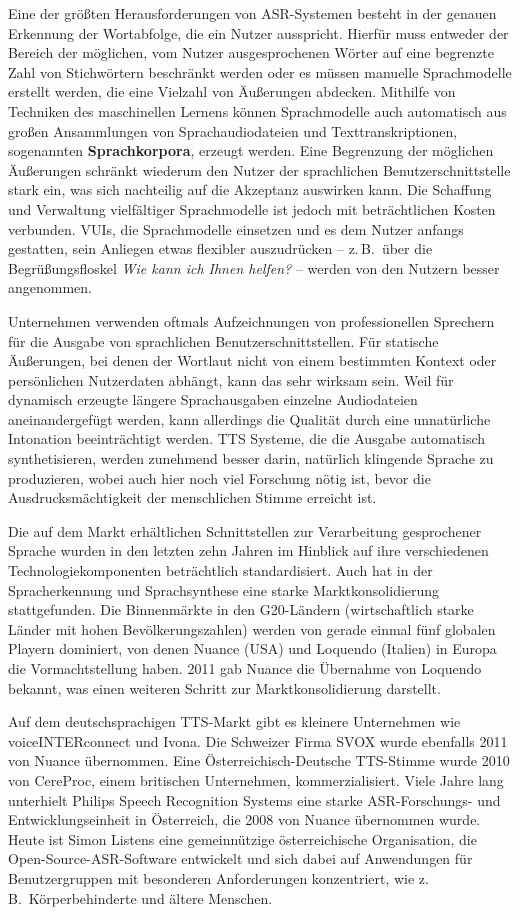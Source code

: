 \begin{multicols}{2}
Eine der größten Herausforderungen von ASR-Syste\-men besteht in der genauen Erkennung der Wortabfolge, die ein Nutzer ausspricht. Hierfür muss entweder der Bereich der möglichen, vom Nutzer ausgesprochenen Wörter auf eine begrenzte Zahl von Stichwörtern beschränkt werden oder es müssen manuelle Sprachmodelle erstellt werden, die eine Vielzahl von Äußerungen abdecken. Mithilfe von Techniken des maschinellen Lernens können Sprachmodelle auch automatisch aus großen Ansammlungen von Sprachaudiodateien und Texttranskriptionen, sogenannten \textbf{Sprachkorpora}, erzeugt werden. Eine Begrenzung der möglichen Äußerungen schränkt wiederum den Nutzer der sprachlichen Benutzerschnittstelle stark ein, was sich nachteilig auf die Akzeptanz auswirken kann. Die Schaffung und Verwaltung vielfältiger Sprachmodelle ist jedoch mit beträchtlichen Kosten verbunden. VUIs, die Sprachmodelle einsetzen und es dem Nutzer anfangs gestatten, sein Anliegen etwas flexibler auszudrücken -- z.\,B.~über die Begrüßungsfloskel \textit{Wie kann ich Ihnen helfen?} -- werden von den Nutzern besser angenommen. 

Unternehmen verwenden oftmals Aufzeichnungen von professionellen Sprechern für die Ausgabe von sprachlichen Benutzerschnittstellen. Für statische Äußerungen, bei denen der Wortlaut nicht von einem bestimmten Kontext oder persönlichen Nutzerdaten abhängt, kann das sehr wirksam sein. 
Weil für dynamisch erzeugte längere Sprachausgaben einzelne Audiodateien aneinandergefügt werden, kann allerdings die Qualität durch eine unnatürliche Intonation beeinträchtigt werden. 
TTS Systeme, die die Ausgabe automatisch synthetisieren, werden zunehmend besser darin, natürlich klingende Sprache zu produzieren, wobei auch hier noch viel Forschung nötig ist, bevor die Ausdrucksmächtigkeit der menschlichen Stimme erreicht ist.

Die auf dem Markt erhältlichen Schnittstellen zur Verarbeitung gesprochener Sprache wurden in den letzten zehn Jahren im Hinblick auf ihre verschiedenen Technologiekomponenten beträchtlich standardisiert. Auch hat in der Spracherkennung und Sprachsynthese eine starke Marktkonsolidierung stattgefunden. Die Binnenmärkte in den G20-Ländern (wirtschaftlich starke Länder mit hohen Bevölkerungszahlen) werden von gerade einmal fünf globalen Playern dominiert, von denen Nuance (USA) und Loquendo (Italien) in Europa die Vormachtstellung haben. 2011 gab Nuance die Übernahme von Loquendo bekannt, was einen weiteren Schritt zur Marktkonsolidierung darstellt.

Auf dem deutschsprachigen TTS-Markt gibt es kleinere Unternehmen wie voiceINTERconnect und Ivona. Die Schweizer Firma SVOX wurde ebenfalls 2011 von Nuance übernommen. Eine Öster\-reichisch-Deutsche TTS-Stimme wurde 2010 von CereProc, einem britischen Unternehmen, kommerzialisiert. Viele Jahre lang unterhielt Philips Speech Recognition Systems eine starke ASR-For\-schungs- und Entwicklungseinheit in Österreich, die 2008 von Nuance übernommen wurde. Heute ist Simon Listens eine gemeinnützige österreichische Organisation, die Open-Source-ASR-Soft\-ware entwickelt und sich dabei auf Anwendungen für Benutzergruppen mit besonderen Anforderungen konzentriert, wie z.\,B.~Körperbehinderte und ältere Menschen.


\end{multicols}
